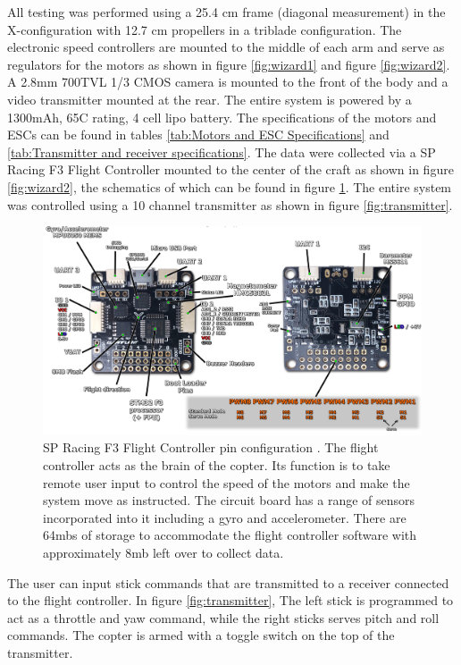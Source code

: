 \documentclass[11pt]{ucthesis}
\begin{document}
All testing was performed using a 25.4 cm frame (diagonal measurement) in the X-configuration with 12.7 cm propellers in a triblade configuration. The electronic speed controllers are mounted to the middle of each arm and serve as regulators for the motors as shown in figure \ref{fig:wizard1} and figure \ref{fig:wizard2}. A 2.8mm 700TVL 1/3 CMOS camera is mounted to the front of the body and a video transmitter mounted at the rear. The entire system is powered by a 1300mAh, 65C rating, 4 cell lipo battery. The specifications of the motors and ESCs can be found in tables \ref{tab:Motors and ESC Specifications} and \ref{tab:Transmitter and receiver specifications}. The data were collected via a SP Racing F3 Flight Controller mounted to the center of the craft as shown in figure \ref{fig:wizard2}, the schematics of which can be found in figure \ref{fig:sp_racing_pro_f3}. The entire system was controlled using a 10 channel transmitter as shown in figure \ref{fig:transmitter}.
\begin{figure}[H]
	\centering
	\includegraphics[width=\textwidth]{sp_racing_pro_f3}
	\caption[SP Racing F3 Flight Controller pin configuration]{SP Racing F3 Flight Controller pin configuration \cite{flightcontroller}. The flight controller acts as the brain of the copter. Its function is to take remote user input to control the speed of the motors and make the system move as instructed. The circuit board has a range of sensors incorporated into it including a gyro and accelerometer. There are 64mbs of storage to accommodate the flight controller software with approximately 8mb left over to collect data.}
	\label{fig:sp_racing_pro_f3}
\end{figure}
\noindent
The user can input stick commands that are transmitted to a receiver connected to the flight controller. In figure \ref{fig:transmitter}, The left stick is programmed to act as a throttle and yaw command, while the right sticks serves pitch and roll commands. The copter is armed with a toggle switch on the top of the transmitter. 
\end{document}
